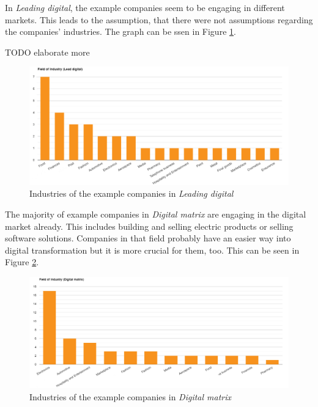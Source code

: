 \documentclass[a4]{scrartcl}
\begin{document}
In \textit{Leading digital}, the example companies seem to be engaging in different markets. This leads to the assumption, that there were not assumptions regarding the companies' industries. The graph can be ssen in Figure \ref{fig:LD_graph_i}.

TODO elaborate more


\begin{figure}[H]
	\centering
	\includegraphics[width=1\textwidth]{images/LD_graph_i.png}
	\caption{Industries of the example companies in \textit{Leading digital} \cite{leadingdigital}}
	\label{fig:LD_graph_i}
\end{figure}

The majority of example companies in \textit{Digital matrix} are engaging in the digital market already. This includes building and selling electric products or selling software solutions. Companies in that field probably have an easier way into digital transformation but it is more crucial for them, too. This can be seen in Figure \ref{fig:DM_graph_i}. \cite{digitalmatrix}

\begin{figure}[H]
	\centering
	\includegraphics[width=1\textwidth]{images/MD_graph_i.png}
	\caption{Industries of the example companies in \textit{Digital matrix} \cite{digitalmatrix}}
	\label{fig:DM_graph_i}
\end{figure}
\end{document}
